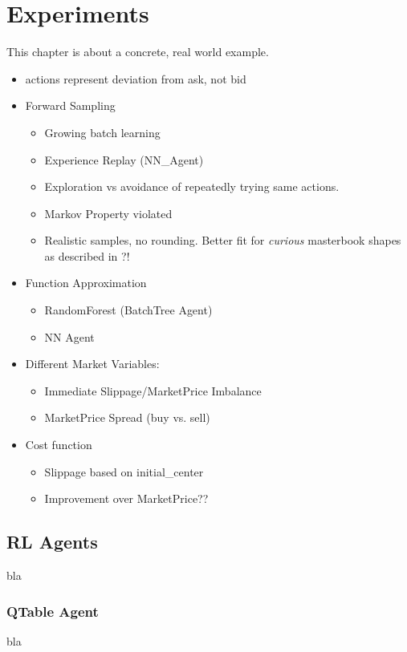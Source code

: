 \chapter{Experiments}
\label{chap:experiments}
This chapter is about a concrete, real world example.



\begin{itemize}
\item actions represent deviation from ask, not bid
\item Forward Sampling
\begin{itemize}
\item Growing batch learning
\item Experience Replay (NN\_Agent)
\item Exploration vs avoidance of repeatedly trying same actions.
\end{itemize}
\begin{itemize}
\item Markov Property violated
\item Realistic samples, no rounding. Better fit for \emph{curious} masterbook shapes as described in ?!
\end{itemize}
\item Function Approximation
\begin{itemize}
\item RandomForest (BatchTree Agent)
\item NN Agent
\end{itemize}
\item Different Market Variables:
\begin{itemize}
\item Immediate Slippage/MarketPrice Imbalance
\item MarketPrice Spread (buy vs. sell)
\end{itemize}
\item Cost function
\begin{itemize}
\item Slippage based on initial\_center
\item Improvement over MarketPrice??
\end{itemize}
\end{itemize}


\section{RL Agents}
bla

\subsection{QTable Agent}
bla

